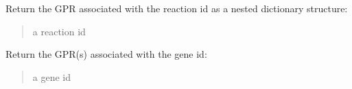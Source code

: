 \documentclass[letterpaper,12pt,english]{sphinxmanual}
\begin{document}
\begin{fulllineitems}
\begin{fulllineitems}
\begin{quote}
\begin{description}
\end{description}\end{quote}

\end{fulllineitems}


\begin{fulllineitems}
\label{\detokenize{api/core:cbmpy.CBModel.Model.getGPRforReactionAsDict}}
\pysigstartsignatures
\pysiglinewithargsret
{}
{\sphinxparamcomma {}}
{}
\pysigstopsignatures
\sphinxAtStartPar
Return the GPR associated with the reaction id as a nested dictionary structure:
\begin{quote}\begin{description}
\sphinxAtStartPar
{} \textendash{} a reaction id

\end{description}\end{quote}

\end{fulllineitems}


\begin{fulllineitems}
\label{\detokenize{api/core:cbmpy.CBModel.Model.getGPRIdAssociatedWithGeneId}}
\pysigstartsignatures
\pysiglinewithargsret
{}
{}
{}
\pysigstopsignatures
\sphinxAtStartPar
Return the GPR(s) associated with the gene id:
\begin{quote}\begin{description}
\sphinxAtStartPar
{} \textendash{} a gene id

\end{description}\end{quote}

\end{fulllineitems}



\end{fulllineitems}
\end{document}
